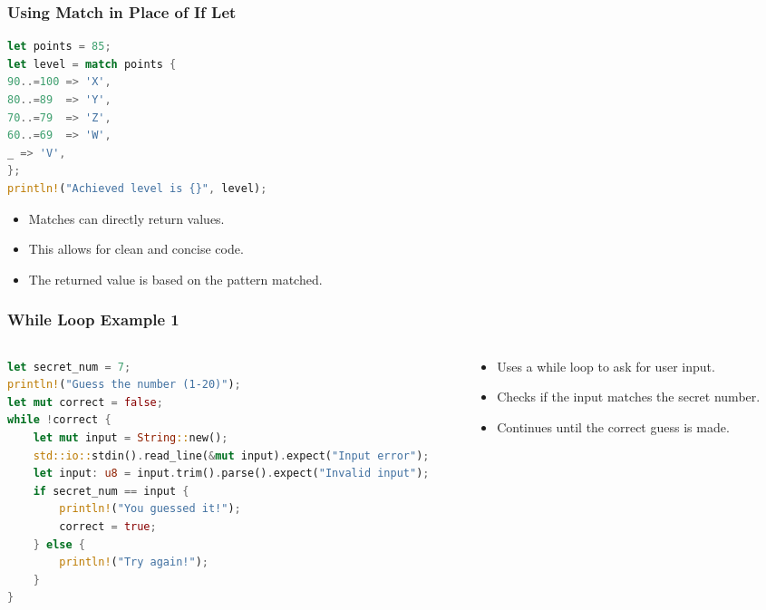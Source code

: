 \documentclass[aspectratio=169, table]{beamer}
\begin{document}
\begin{frame}[fragile]
\frametitle{Using Match in Place of If Let}
\begin{lstlisting}[language=Rust]
let points = 85; 
let level = match points {
90..=100 => 'X', 
80..=89  => 'Y', 
70..=79  => 'Z',
60..=69  => 'W',
_ => 'V',
};
println!("Achieved level is {}", level);	
\end{lstlisting}
\begin{itemize}
\item Matches can directly return values.
\item This allows for clean and concise code.
\item The returned value is based on the pattern matched.
\end{itemize}
\end{frame}

\begin{frame}[fragile]
\frametitle{While Loop Example 1}
\vspace{10pt}
\begin{columns}[t,onlytextwidth]
\begin{column}{0.7\textwidth}
\begin{lstlisting}[language=Rust]
let secret_num = 7;
println!("Guess the number (1-20)");
let mut correct = false;
while !correct {
	let mut input = String::new();
	std::io::stdin().read_line(&mut input).expect("Input error");
	let input: u8 = input.trim().parse().expect("Invalid input");
	if secret_num == input {
		println!("You guessed it!");
		correct = true;
	} else {
		println!("Try again!");
	}
}
\end{lstlisting}
\end{column}
\begin{column}{0.3\textwidth}
\begin{itemize}
\item Uses a while loop to ask for user input.
\item Checks if the input matches the secret number.
\item Continues until the correct guess is made.
\end{itemize}
\end{column}
\end{columns}
\end{frame}
\end{document}
